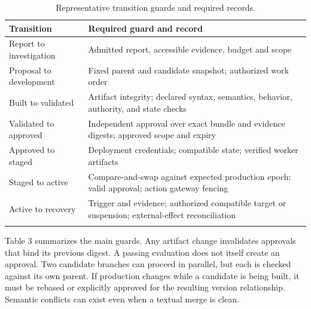 \documentclass[preprint,12pt,authoryear]{elsarticle}
\begin{document}
\begin{table}[!htbp]\centering\footnotesize
\caption{Representative transition guards and required
records.}
\medskip
\begin{tabular}{@{}
  >{\raggedright\arraybackslash}p{}
  >{\raggedright\arraybackslash}p{}@{}}
\toprule\noalign{}
\begin{minipage}[b]{\linewidth}\raggedright
Transition
\end{minipage} & \begin{minipage}[b]{\linewidth}\raggedright
Required guard and record
\end{minipage} \\
\midrule\noalign{}

Report to investigation & Admitted report, accessible evidence, budget
and scope \\
\addlinespace[4pt]
Proposal to development & Fixed parent and candidate snapshot;
authorized work order \\
\addlinespace[4pt]
Built to validated & Artifact integrity; declared syntax, semantics,
behavior, authority, and state checks \\
\addlinespace[4pt]
Validated to approved & Independent approval over exact bundle and
evidence digests; approved scope and expiry \\
\addlinespace[4pt]
Approved to staged & Deployment credentials; compatible state; verified
worker artifacts \\
\addlinespace[4pt]
Staged to active & Compare-and-swap against expected production epoch;
valid approval; action gateway fencing \\
\addlinespace[4pt]
Active to recovery & Trigger and evidence; authorized compatible target
or suspension; external-effect reconciliation \\
\addlinespace[4pt]
\bottomrule
\end{tabular}
\end{table}


Table 3 summarizes the main guards. Any artifact change invalidates
approvals that bind its previous digest. A passing evaluation does not
itself create an approval. Two candidate branches can proceed in
parallel, but each is checked against its own parent. If production
changes while a candidate is being built, it must be rebased or
explicitly approved for the resulting version relationship. Semantic
conflicts can exist even when a textual merge is clean.
\end{document}
